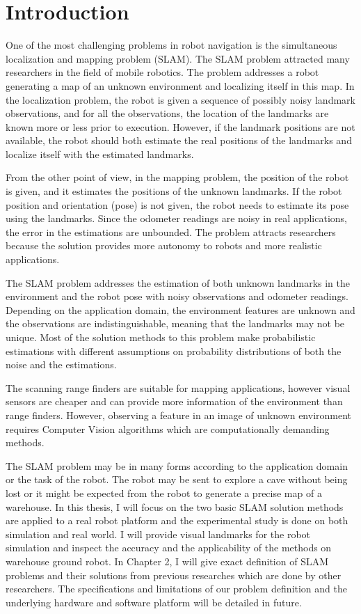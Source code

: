 \chapter{Introduction}

One of the most challenging problems in robot navigation is the simultaneous localization and mapping problem (SLAM). The SLAM problem attracted many researchers in the field of mobile robotics. The problem addresses a robot generating a map of an unknown environment and localizing itself in this map.
In the localization problem, the robot is given a sequence of possibly noisy landmark observations, and for all the observations, the location of the landmarks are known more or less prior to execution. However, if the landmark positions are not available, the robot should both estimate the real positions of the landmarks and localize itself with the estimated landmarks.

From the other point of view, in the mapping problem, the position of the robot is given, and it estimates the positions of the unknown landmarks. If the robot position and orientation (pose) is not given, the robot needs to estimate its pose using the landmarks. Since the odometer readings are noisy in real applications, the error in the estimations are unbounded. The problem attracts researchers because the solution provides more autonomy to robots and more realistic applications.

The SLAM problem addresses the estimation of both unknown landmarks in the environment and the robot pose with noisy observations and odometer readings. Depending on the application domain, the environment features are unknown and the observations are indistinguishable, meaning that the landmarks may not be unique. Most of the solution methods to this problem make probabilistic estimations with different assumptions on probability distributions of both the noise and the estimations.

The scanning range finders are suitable for mapping applications, however visual sensors are cheaper and can provide more information of the environment than range finders. However, observing a feature in an image of unknown environment requires Computer Vision algorithms which are computationally demanding methods. 

The SLAM problem may be in many forms according to the application domain or the task of the robot. The robot may be sent to explore a cave without being lost or it might be expected from the robot to generate a precise map of a warehouse. In this thesis, I will focus on the two basic SLAM solution methods are applied to a real robot platform and the experimental study is done on both simulation and real world. I will provide visual landmarks for the robot simulation and inspect the accuracy and the applicability of the methods on warehouse ground robot. In Chapter 2, I will give exact definition of SLAM problems and their solutions from previous researches which are done by other researchers. The specifications and limitations of our problem definition and the underlying hardware and software platform will be detailed in future.